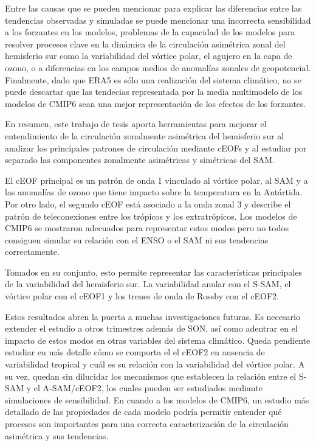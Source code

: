 \documentclass[12pt,oneside,a4paper]{reedthesis}
\begin{document}
Entre las causas que se pueden mencionar para explicar las diferencias entre las tendencias observadas y simuladas se puede mencionar una incorrecta sensibilidad a los forzantes en los modelos, problemas de la capacidad de los modelos para resolver procesos clave en la dinámica de la circulación asimétrica zonal del hemisferio sur como la variabilidad del vórtice polar, el agujero en la capa de ozono, o a diferencias en los campos medios de anomalías zonales de geopotencial.
Finalmente, dado que ERA5 es sólo una realización del sistema climático, no se puede descartar que las tendecias representada por la media multimodelo de los modelos de CMIP6 sean una mejor representación de los efectos de los forzantes.

En resumen, este trabajo de tesis aporta herramientas para mejorar el entendimiento de la circulación zonalmente asimétrica del hemisferio sur al analizar los principales patrones de circulación mediante cEOFs y al estudiar por separado las componentes zonalmente asimétricas y simétricas del SAM.

El cEOF principal es un patrón de onda 1 vinculado al vórtice polar, al SAM y a las anomalías de ozono que tiene impacto sobre la temperatura en la Antártida.
Por otro lado, el segundo cEOF está asociado a la onda zonal 3 y describe el patrón de teleconexiones entre los trópicos y los extratrópicos.
Los modelos de CMIP6 se mostraron adecuados para representar estos modos pero no todos consiguen simular su relación con el ENSO o el SAM ni sus tendencias correctamente.

Tomados en su conjunto, esto permite representar las características principales de la variabilidad del hemisferio sur.
La variabilidad anular con el S-SAM, el vórtice polar con el cEOF1 y los trenes de onda de Rossby con el cEOF2.

Estos resultados abren la puerta a muchas investigaciones futuras.
Es necesario extender el estudio a otros trimestres además de SON, así como adentrar en el impacto de estos modos en otras variables del sistema climático.
Queda pendiente estudiar en más detalle cómo se comporta el el cEOF2 en ausencia de variabilidad tropical y cuál es su relación con la variabilidad del vórtice polar.
A su vez, quedan sin dilucidar los mecanismos que establecen la relación entre el S-SAM y el A-SAM/cEOF2, los cuales pueden ser estudiados mediante simulaciones de sensibilidad.
En cuando a los modelos de CMIP6, un estudio más detallado de las propiedades de cada modelo podría permitir entender qué procesos son importantes para una correcta caracterización de la circulación asimétrica y sus tendencias.
\end{document}
